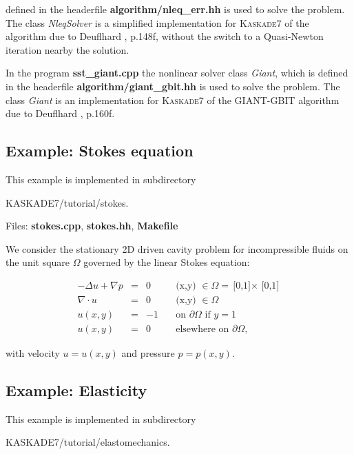 \documentclass[11pt]{article}
\newcommand{\K}{\textsc{Kaskade7 }}
\begin{document}
defined in the headerfile {\bf algorithm/nleq\_err.hh} is used to solve the problem. The class {\em
NleqSolver} is a simplified implementation for \K of the   algorithm due to Deuflhard
\cite{DdBook2006}, p.148f, without the switch to a Quasi-Newton iteration nearby the solution. \par
In the program {\bf sst\_giant.cpp} the nonlinear solver class {\em Giant}, which is defined in the headerfile 
{\bf algorithm/giant\_gbit.hh} is used to solve the problem. The class {\em Giant} is an implementation for \K of
the GIANT-GBIT algorithm due to Deuflhard \cite{DdBook2006}, p.160f.

\subsection{Example: Stokes equation}\label{StokesEq}
This example is implemented in subdirectory 
\begin{center} KASKADE7/tutorial/stokes.\end{center}

\noindent Files: {\bf stokes.cpp}, {\bf stokes.hh}, {\bf Makefile}

\noindent We consider the stationary 2D driven cavity problem for incompressible fluids
on the unit square $\Omega$ governed by the  linear Stokes equation: 


\begin{equation}\label{PDE_stokes}
\begin{array}{rcll}
 -\Delta u + \nabla p &=& 0 &\quad \mbox{(x,y) }\in  \Omega = \mbox{[0,1]$\times$ [0,1]}\\[2mm]
 \nabla  \cdot u &=& 0 &\quad \mbox{(x,y) }\in  \Omega\\[2mm]
u(x,y) &=&-1 &\quad \mbox{on } \partial \Omega \mbox{ if }  y = 1\\[2mm]
u(x,y) &=& 0 &\quad \mbox{elsewhere on } \partial \Omega ,
\end{array}
\end{equation}

\noindent with velocity $u = u(x,y)$ and pressure $p = p(x,y)$.


\subsection{Example: Elasticity}\label{ElastoEq}
This example is implemented in subdirectory 
\begin{center} KASKADE7/tutorial/elastomechanics.\end{center}
\end{document}
